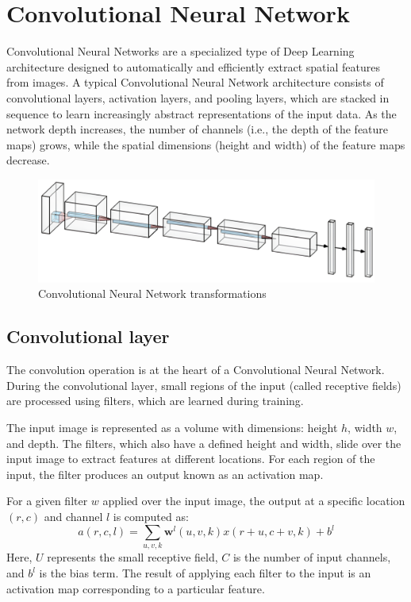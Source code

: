 \section{Convolutional Neural Network}

Convolutional Neural Networks are a specialized type of Deep Learning architecture designed to automatically and efficiently extract spatial features from images.
A typical Convolutional Neural Network architecture consists of convolutional layers, activation layers, and pooling layers, which are stacked in sequence to learn increasingly abstract representations of the input data.
As the network depth increases, the number of channels (i.e., the depth of the feature maps) grows, while the spatial dimensions (height and width) of the feature maps decrease.
\begin{figure}[H]
    \centering
    \includegraphics[width=1\linewidth]{images/cnn.png}
    \caption{Convolutional Neural Network transformations}
\end{figure}

\subsection{Convolutional layer}
The convolution operation is at the heart of a Convolutional Neural Network. 
During the convolutional layer, small regions of the input (called receptive fields) are processed using filters, which are learned during training.

The input image is represented as a volume with dimensions: height $h$, width $w$, and depth. 
The filters, which also have a defined height and width, slide over the input image to extract features at different locations. 
For each region of the input, the filter produces an output known as an activation map.

For a given filter $w$ applied over the input image, the output at a specific location $(r, c)$ and channel $l$ is computed as:
\[a(r,c,l)=\sum_{u,v,k}\mathbf{w}^l(u,v,k)x(r+u,c+v,k)+b^l\]
Here, $U$ represents the small receptive field, $C$ is the number of input channels, and $b^l$ is the bias term. 
The result of applying each filter to the input is an activation map corresponding to a particular feature.


